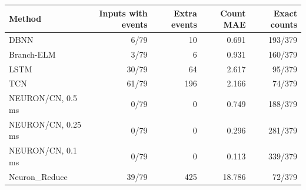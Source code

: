 \begin{tabular}{lrrrr}
\toprule
Method & Inputs with events & Extra events & Count MAE & Exact counts\\
\midrule
DBNN & 6/79 & 10 & 0.691 & 193/379 \\
Branch-ELM & 3/79 & 6 & 0.931 & 160/379 \\
LSTM & 30/79 & 64 & 2.617 & 95/379 \\
TCN & 61/79 & 196 & 2.166 & 74/379 \\
NEURON/CN, 0.5 ms & 0/79 & 0 & 0.749 & 188/379 \\
NEURON/CN, 0.25 ms & 0/79 & 0 & 0.296 & 281/379 \\
NEURON/CN, 0.1 ms & 0/79 & 0 & 0.113 & 339/379 \\
Neuron\_Reduce & 39/79 & 425 & 18.786 & 72/379 \\
\bottomrule
\end{tabular}
